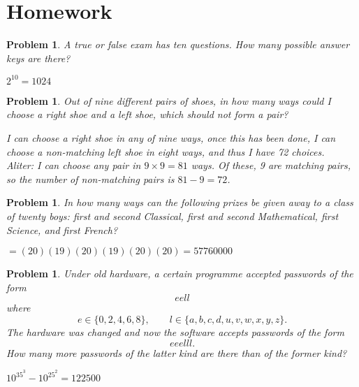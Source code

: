 \documentclass[11pt, openany]{book}
\theoremstyle{change} \theoremheaderfont{\blue\sffamily\bfseries}
\newtheorem{pro}[thm]{Problem}
\theoremstyle{nonumberplain} \theoremheaderfont{\sffamily\bfseries}
\newcommand{\í}{\'{\i}}
\begin{document}
\section*{Homework}
\begin{multicols}{2}\columnseprule 1pt \columnsep 25pt
\begin{pro}
A true or false exam has ten questions. How many possible answer
keys are there?
\begin{answer}$2^{10}=1024$
\end{answer}
  \end{pro}

\begin{pro} Out of nine different pairs of shoes, in how many ways could I choose a
right shoe and a left shoe, {which should not form a pair}?
\begin{answer} I can choose a right shoe in any of nine ways, once this
has been done, I can choose a non-matching left shoe in eight ways,
and thus I have
72 choices.\\
{\em Aliter}:  I can choose any pair in $9 \times 9 = 81$ ways. Of
these, 9 are matching pairs, so the number of non-matching pairs is
$81 - 9 = 72$.
\end{answer}
\end{pro}
  \begin{pro} In how many ways can the following prizes be given away to a
class of twenty boys: first and second Classical, first and second
Mathematical, first Science, and first French? \begin{answer}
$=(20)(19)(20)(19)(20)(20)= 57760000$
\end{answer}
   \end{pro}
     \begin{pro}
Under old hardware, a certain programme accepted passwords of the
form $$eell $$where $$ e\in \{0,2,4,6,8\},   \qquad
l\in\{a,b,c,d,u,v,w,x,y,z\}.$$ The hardware was changed and now the
software accepts passwords of the form $$eeelll.   $$ How many more
passwords of the latter kind are there than of the former kind?
\begin{answer}$10^35^3-10^25^2= 122500$
\end{answer}
 \end{pro}


\end{multicols}
\end{document}
